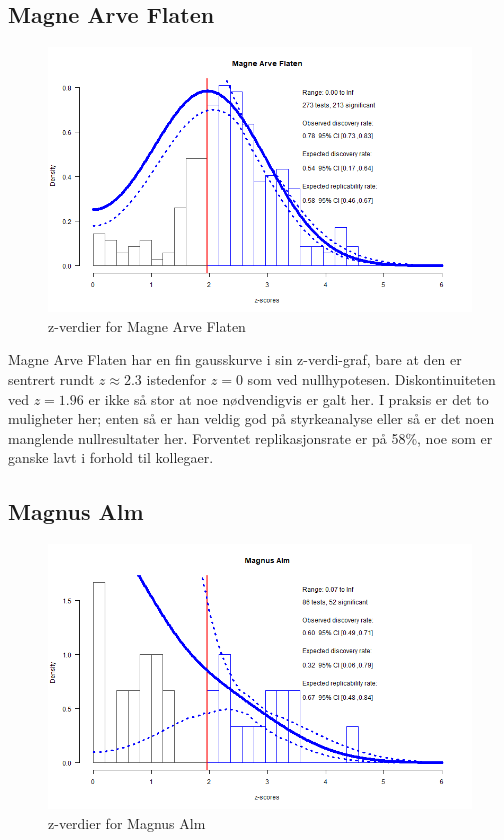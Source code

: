 \documentclass[doc,norsk]{apa7}
\begin{document}
\subsection{Magne Arve Flaten}
\begin{figure}[h!]
    \centering
    \includegraphics[width=\textwidth]{images/Magne Arve Flaten.png}
    \caption{z-verdier for Magne Arve Flaten}
\end{figure}

Magne Arve Flaten har en fin gausskurve i sin z-verdi-graf, bare at den er sentrert rundt $z \approx 2.3$ istedenfor $z = 0$ som ved nullhypotesen. Diskontinuiteten ved $z = 1.96$ er ikke så stor at noe nødvendigvis er galt her. I praksis er det to muligheter her; enten så er han veldig god på styrkeanalyse eller så er det noen manglende nullresultater her. Forventet replikasjonsrate er på 58\%, noe som er ganske lavt i forhold til kollegaer.

\subsection{Magnus Alm}
\begin{figure}[h!]
    \centering
    \includegraphics[width=\textwidth]{images/Magnus Alm.png}
    \caption{z-verdier for Magnus Alm}
\end{figure}
\end{document}
